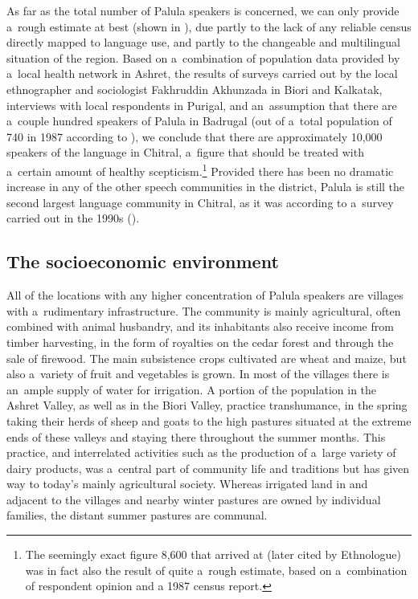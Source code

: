As far as the total number of Palula speakers is concerned, we can only provide a~rough estimate at
best (shown in ), due partly to the lack of any reliable census directly mapped
to language use, and partly to the changeable and multilingual situation of the region. Based on
a~combination of population data provided by a~local health network in Ashret, the results of
surveys carried out by the local ethnographer and sociologist Fakhruddin Akhunzada in Biori and Kalkatak,
interviews with local respondents in Purigal, and an~assumption that there are a~couple hundred
speakers of Palula in Badrugal (out of a~total population of 740 in 1987 according to
\citealt[143]{decker1992a}), we conclude that there are approximately 10,000 speakers of the
language in Chitral, a~figure that should be treated with a~certain amount of healthy
scepticism.\footnote{The seemingly exact figure 8,600 that \citep[74--76]{decker1992a} arrived at
  (later cited by Ethnologue) was in fact also the result of quite a~rough estimate, based on
  a~combination of respondent opinion and a 1987 census report.} Provided there has been no dramatic increase in any of the other speech communities in the district, Palula is still the second largest language community in Chitral, as it was according to a~survey carried out in the 1990s (\citealt[11]{decker1992a}). 

\subsection{The socioeconomic environment}
\label{subsec:1-2-2}

All of the locations with any higher concentration of Palula speakers are villages with a~rudimentary infrastructure. The community is mainly agricultural, often combined with animal husbandry, and its inhabitants also receive income from timber harvesting, in the form of royalties on the cedar forest and through the sale of firewood. The main subsistence crops cultivated are wheat and maize, but also a~variety of fruit and vegetables is grown. In most of the villages there is an~ample supply of water for irrigation. A portion of the population in the Ashret Valley, as well as in the Biori Valley, practice transhumance, in the spring taking their herds of sheep and goats to the high pastures situated at the extreme ends of these valleys and staying there throughout the summer months. This practice, and interrelated activities such as the production of a~large variety of dairy products, was a~central part of community life and traditions but has given way to today's mainly agricultural society. Whereas irrigated land in and adjacent to the villages and nearby winter pastures are owned by individual families, the distant summer pastures are communal.

